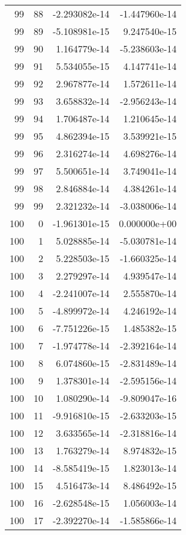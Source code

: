 \begin{tabular}{rrrr}
  99 &   88 & -2.293082e-14 & -1.447960e-14 \\
  99 &   89 & -5.108981e-15 &  9.247540e-15 \\
  99 &   90 &  1.164779e-14 & -5.238603e-14 \\
  99 &   91 &  5.534055e-15 &  4.147741e-14 \\
  99 &   92 &  2.967877e-14 &  1.572611e-14 \\
  99 &   93 &  3.658832e-14 & -2.956243e-14 \\
  99 &   94 &  1.706487e-14 &  1.210645e-14 \\
  99 &   95 &  4.862394e-15 &  3.539921e-15 \\
  99 &   96 &  2.316274e-14 &  4.698276e-14 \\
  99 &   97 &  5.500651e-14 &  3.749041e-14 \\
  99 &   98 &  2.846884e-14 &  4.384261e-14 \\
  99 &   99 &  2.321232e-14 & -3.038006e-14 \\
 100 &    0 & -1.961301e-15 &  0.000000e+00 \\
 100 &    1 &  5.028885e-14 & -5.030781e-14 \\
 100 &    2 &  5.228503e-15 & -1.660325e-14 \\
 100 &    3 &  2.279297e-14 &  4.939547e-14 \\
 100 &    4 & -2.241007e-14 &  2.555870e-14 \\
 100 &    5 & -4.899972e-14 &  4.246192e-14 \\
 100 &    6 & -7.751226e-15 &  1.485382e-15 \\
 100 &    7 & -1.974778e-14 & -2.392164e-14 \\
 100 &    8 &  6.074860e-15 & -2.831489e-14 \\
 100 &    9 &  1.378301e-14 & -2.595156e-14 \\
 100 &   10 &  1.080290e-14 & -9.809047e-16 \\
 100 &   11 & -9.916810e-15 & -2.633203e-15 \\
 100 &   12 &  3.633565e-14 & -2.318816e-14 \\
 100 &   13 &  1.763279e-14 &  8.974832e-15 \\
 100 &   14 & -8.585419e-15 &  1.823013e-14 \\
 100 &   15 &  4.516473e-14 &  8.486492e-15 \\
 100 &   16 & -2.628548e-15 &  1.056003e-14 \\
 100 &   17 & -2.392270e-14 & -1.585866e-14 \\

\end{tabular}
